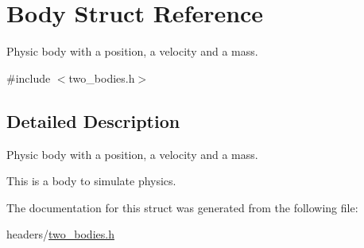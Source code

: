 \hypertarget{struct_body}{}\section{Body Struct Reference}
\label{struct_body}


Physic body with a position, a velocity and a mass.  




{\ttfamily \#include $<$two\+\_\+bodies.\+h$>$}



\subsection{Detailed Description}
Physic body with a position, a velocity and a mass. 

This is a body to simulate physics. 

The documentation for this struct was generated from the following file\+:\begin{DoxyCompactItemize}
\item 
headers/\hyperlink{two__bodies_8h}{two\+\_\+bodies.\+h}\end{DoxyCompactItemize}
